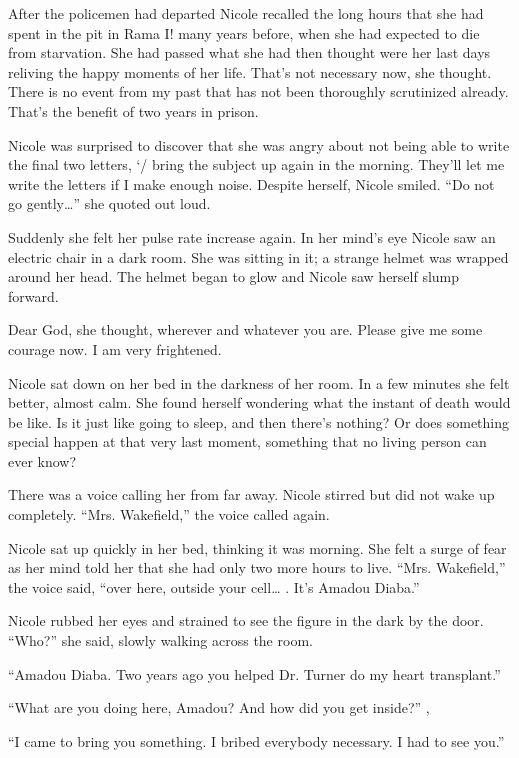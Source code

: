 \documentclass[]{article}
\begin{document}
{{After the policemen had departed Nicole recalled the long hours that she had spent in the pit in Rama I! many years before, when she had expected to die from starvation.  She had passed what she had then thought were her last days reliving the happy moments of her life.  That’s not necessary now, she thought.  There is no event from my past that has not been thoroughly scrutinized already.  That’s the benefit of two years in prison.

Nicole was surprised to discover that she was angry about not being able to write the final two letters, ‘/ bring the subject up again in the morning.  They’ll let me write the letters if I make enough noise.  Despite herself, Nicole smiled.  “Do not go gently…” she quoted out loud.

Suddenly she felt her pulse rate increase again.  In her mind’s eye Nicole saw an electric chair in a dark room.  She was sitting in it; a strange helmet was wrapped around her head.  The helmet began to glow and Nicole saw herself slump forward.

Dear God, she thought, wherever and whatever you are.  Please give me some courage now.  I am very frightened.

Nicole sat down on her bed in the darkness of her room.  In a few minutes she felt better, almost calm.  She found herself wondering what the instant of death would be like.  Is it just like going to sleep, and then there’s nothing?  Or does something special happen at that very last moment, something that no living person can ever know?

There was a voice calling her from far away.  Nicole stirred but did not wake up completely.  “Mrs.  Wakefield,” the voice called again.

Nicole sat up quickly in her bed, thinking it was morning.  She felt a surge of fear as her mind told her that she had only two more hours to live.  “Mrs.  Wakefield,” the voice said, “over here, outside your cell… .  It’s Amadou Diaba.”

Nicole rubbed her eyes and strained to see the figure in the dark by the door.  “Who?” she said, slowly walking across the room.

“Amadou Diaba.  Two years ago you helped Dr.  Turner do my heart transplant.”

“What are you doing here, Amadou? And how did you get inside?” ,

“I came to bring you something.  I bribed everybody necessary.  I had to see you.”

}}
\end{document}

